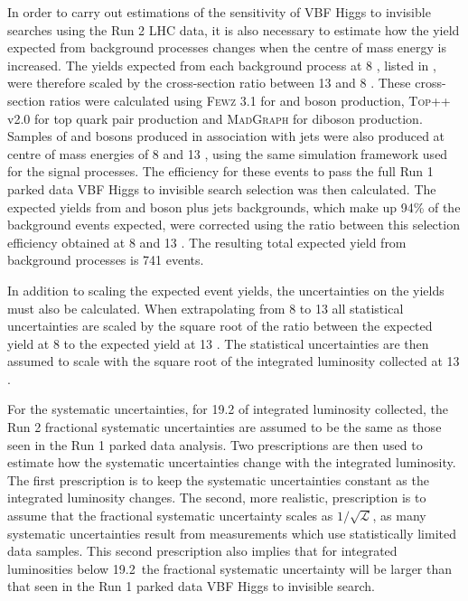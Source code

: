 In order to carry out estimations of the sensitivity of \ac{VBF} Higgs to invisible searches using the Run 2 LHC data, it is also necessary to estimate how the yield expected from background processes changes when the centre of mass energy is increased. The yields expected from each background process at 8 \TeV, listed in , were therefore scaled by the cross-section ratio between 13 and 8 \TeV. These cross-section ratios were calculated using \textsc{Fewz} 3.1 for \PW and \PZ boson production, \textsc{Top++} v2.0 for top quark pair production and \textsc{MadGraph} for diboson production. Samples of \PW and \PZ bosons produced in association with jets were also produced at centre of mass energies of 8 and 13 \TeV, using the same simulation framework used for the signal processes. The efficiency for these events to pass the full Run 1 parked data \ac{VBF} Higgs to invisible search selection was then calculated. The expected yields from \PW and \PZ boson plus jets backgrounds, which make up 94\% of the background events expected, were corrected using the ratio between this selection efficiency obtained at 8 and 13 \TeV. The resulting total expected yield from background processes is 741 events.

In addition to scaling the expected event yields, the uncertainties on the yields must also be calculated. When extrapolating from 8 to 13 \TeV all statistical uncertainties are scaled by the square root of the ratio between the expected yield at 8 \TeV to the expected yield at 13 \TeV. The statistical uncertainties are then assumed to scale with the square root of the integrated luminosity collected at 13 \TeV.

For the systematic uncertainties, for 19.2 \invfb of integrated luminosity collected, the Run 2 fractional systematic uncertainties are assumed to be the same as those seen in the Run 1 parked data analysis. Two prescriptions are then used to estimate how the systematic uncertainties change with the integrated luminosity. The first prescription is to keep the systematic uncertainties constant as the integrated luminosity changes. The second, more realistic, prescription is to assume that the fractional systematic uncertainty scales as $1/\sqrt{\mathcal{L}}$, as many systematic uncertainties result from measurements which use statistically limited data samples. This second prescription also implies that for integrated luminosities below 19.2 \invfb\,the fractional systematic uncertainty will be larger than that seen in the Run 1 parked data \ac{VBF} Higgs to invisible search.



